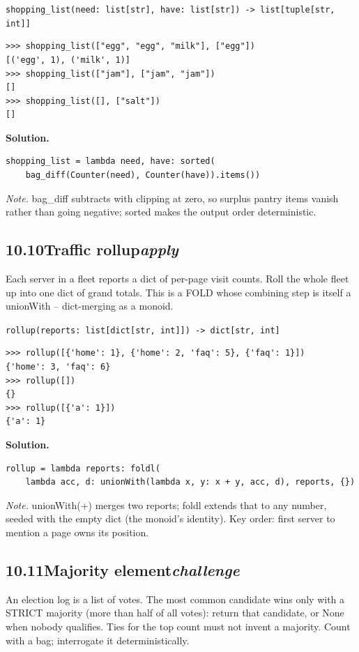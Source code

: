\documentclass[10pt,letterpaper]{book}
\begin{document}
\noindent\texttt{shopping\_list(need: list[str], have: list[str]) -> list[tuple[str, int]]}
\begin{lstlisting}[style=ex]
>>> shopping_list(["egg", "egg", "milk"], ["egg"])
[('egg', 1), ('milk', 1)]
>>> shopping_list(["jam"], ["jam", "jam"])
[]
>>> shopping_list([], ["salt"])
[]
\end{lstlisting}
\noindent\textbf{Solution.}
\begin{lstlisting}[style=code]
shopping_list = lambda need, have: sorted(
    bag_diff(Counter(need), Counter(have)).items())
\end{lstlisting}
\noindent\textit{Note.} bag\_diff subtracts with clipping at zero, so surplus pantry items vanish rather than going negative; sorted makes the output order deterministic.

\subsection*{10.10\quad Traffic rollup\hfill\textnormal{\textit{apply}}}
Each server in a fleet reports a dict of per-page visit counts. Roll the whole fleet up into one dict of grand totals. This is a FOLD whose combining step is itself a unionWith -- dict-merging as a monoid.

\noindent\texttt{rollup(reports: list[dict[str, int]]) -> dict[str, int]}
\begin{lstlisting}[style=ex]
>>> rollup([{'home': 1}, {'home': 2, 'faq': 5}, {'faq': 1}])
{'home': 3, 'faq': 6}
>>> rollup([])
{}
>>> rollup([{'a': 1}])
{'a': 1}
\end{lstlisting}
\noindent\textbf{Solution.}
\begin{lstlisting}[style=code]
rollup = lambda reports: foldl(
    lambda acc, d: unionWith(lambda x, y: x + y, acc, d), reports, {})
\end{lstlisting}
\noindent\textit{Note.} unionWith(+) merges two reports; foldl extends that to any number, seeded with the empty dict (the monoid's identity). Key order: first server to mention a page owns its position.

\subsection*{10.11\quad Majority element\hfill\textnormal{\textit{challenge}}}
An election log is a list of votes. The most common candidate wins only with a STRICT majority (more than half of all votes): return that candidate, or None when nobody qualifies. Ties for the top count must not invent a majority. Count with a bag; interrogate it deterministically.
\end{document}
